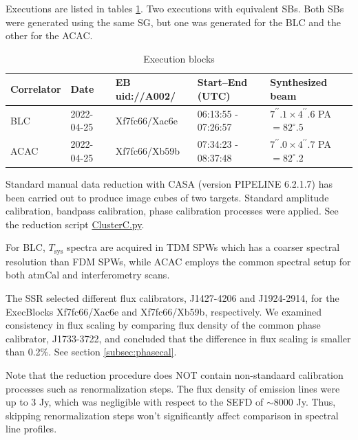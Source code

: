 \documentclass[a4paper, 10pt]{scrartcl}
\begin{document}
Executions are listed in tables \ref{tab:EBlist}. Two executions with equivalent SBs. Both SBs were generated using the same SG, but one was generated for the BLC and the other for the ACAC.


\begin{table}[h]
\centering
\caption{Execution blocks}
\label{tab:EBlist}
\begin{tabular}{lllll} \hline \hline
Correlator & Date        & EB  uid://A002/   & Start--End (UTC)    & Synthesized beam  \\ \hline 
BLC        & 2022-04-25  & Xf7fc66/Xac6e & 06:13:55 - 07:26:57 & $7^{\prime \prime}.1\times 4^{\prime \prime}.6$ PA$=82^{\circ}.5$ \\
ACAC       & 2022-04-25  & Xf7fc66/Xb59b & 07:34:23 - 08:37:48 & $7^{\prime \prime}.0\times 4^{\prime \prime}.7$ PA$=82^{\circ}.2$ \\ \hline
\end{tabular}
\end{table}

Standard manual data reduction with CASA (version PIPELINE 6.2.1.7) has been carried out to produce image cubes of two targets.
Standard amplitude calibration, bandpass calibration, phase calibration processes were applied.
See the reduction script \href{https://jira.alma.cl/secure/attachment/457290/ClusterC.py}{ClusterC.py}.

For BLC, $T_{\mathrm{sys}}$ spectra are acquired in TDM SPWs which has a coarser spectral resolution than FDM SPWs, while ACAC employs the common spectral setup for both atmCal and interferometry scans.

The SSR selected different flux calibrators, J1427-4206 and J1924-2914, for the ExecBlocks Xf7fc66/Xac6e and Xf7fc66/Xb59b, respectively.
We examined consistency in flux scaling by comparing flux density of the common phase calibrator, J1733-3722, and concluded that the difference in flux scaling is smaller than 0.2\%. See section \ref{subsec:phasecal}.

Note that the reduction procedure does NOT contain non-standaard calibration processes such as renormalization steps.
The flux density of emission lines were up to 3 Jy, which was negligible with respect to the SEFD of $\sim 8000$ Jy.
Thus, skipping renormalization steps won't significantly affect comparison in spectral line profiles.
\end{document}
